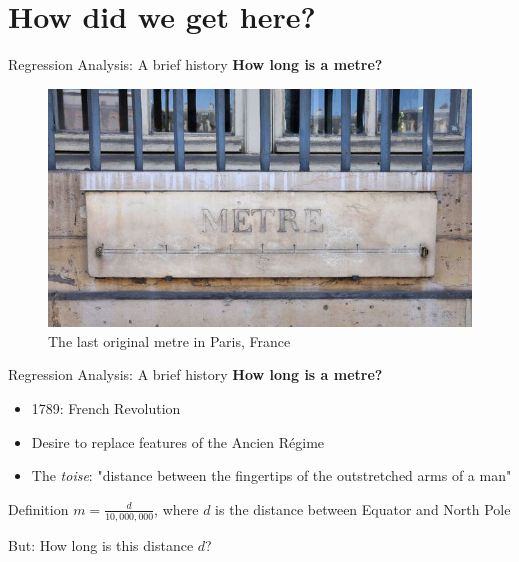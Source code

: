 \documentclass[t]{beamer} 	%
\begin{document}

\section{How did we get here?}

\begin{frame}{Regression Analysis: A brief history}
	\textbf{How long is a metre?}
	\begin{figure}
		\includegraphics[width=\textwidth]{images/metre.jpg}
		\caption*{The last original metre in Paris, France}
	\end{figure}
\end{frame}

\begin{frame}{Regression Analysis: A brief history}
	\textbf{How long is a metre?}
	\begin{itemize}
		\item 1789: French Revolution
		\item Desire to replace features of the Ancien Régime
		\item The \textit{toise}: "distance between the fingertips of the outstretched arms of a man" \citep{toise}
	\end{itemize}
	\pause
	\begin{pabox}{Definition}
		$m = \frac{d}{10,000,000}$,
		where $d$ is the distance between Equator and North Pole
	\end{pabox}
	\pause
	But: How long is this distance $d$?
\end{frame}
\end{document}
